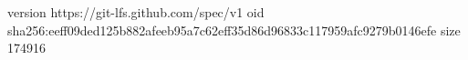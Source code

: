 version https://git-lfs.github.com/spec/v1
oid sha256:eeff09ded125b882afeeb95a7c62eff35d86d96833c117959afc9279b0146efe
size 174916
